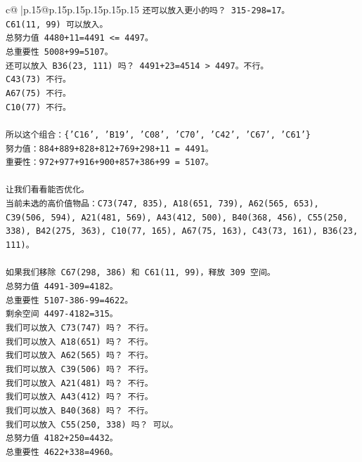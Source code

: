 \documentclass{article}
\begin{document}
{\begin{supertabular}{c@{$\;$}|p{.15\linewidth}@{}p{.15\linewidth}p{.15\linewidth}p{.15\linewidth}p{.15\linewidth}p{.15\linewidth}}
{{{\texttt{还可以放入更小的吗？ 315{-}298=17。} \\
\texttt{C61(11, 99) 可以放入。} \\
\texttt{总努力值 4480+11=4491 <= 4497。} \\
\texttt{总重要性 5008+99=5107。} \\
\texttt{还可以放入 B36(23, 111) 吗？ 4491+23=4514 > 4497。不行。} \\
\texttt{C43(73) 不行。} \\
\texttt{A67(75) 不行。} \\
\texttt{C10(77) 不行。} \\
\\ 
\texttt{所以这个组合：\{'C16', 'B19', 'C08', 'C70', 'C42', 'C67', 'C61'\}} \\
\texttt{努力值：884+889+828+812+769+298+11 = 4491。} \\
\texttt{重要性：972+977+916+900+857+386+99 = 5107。} \\
\\ 
\texttt{让我们看看能否优化。} \\
\texttt{当前未选的高价值物品：C73(747, 835), A18(651, 739), A62(565, 653), C39(506, 594), A21(481, 569), A43(412, 500), B40(368, 456), C55(250, 338), B42(275, 363), C10(77, 165), A67(75, 163), C43(73, 161), B36(23, 111)。} \\
\\ 
\texttt{如果我们移除 C67(298, 386) 和 C61(11, 99)，释放 309 空间。} \\
\texttt{总努力值 4491{-}309=4182。} \\
\texttt{总重要性 5107{-}386{-}99=4622。} \\
\texttt{剩余空间 4497{-}4182=315。} \\
\texttt{我们可以放入 C73(747) 吗？ 不行。} \\
\texttt{我们可以放入 A18(651) 吗？ 不行。} \\
\texttt{我们可以放入 A62(565) 吗？ 不行。} \\
\texttt{我们可以放入 C39(506) 吗？ 不行。} \\
\texttt{我们可以放入 A21(481) 吗？ 不行。} \\
\texttt{我们可以放入 A43(412) 吗？ 不行。} \\
\texttt{我们可以放入 B40(368) 吗？ 不行。} \\
\texttt{我们可以放入 C55(250, 338) 吗？ 可以。} \\
\texttt{总努力值 4182+250=4432。} \\
\texttt{总重要性 4622+338=4960。} \\
}}}
\end{supertabular}}
\end{document}
